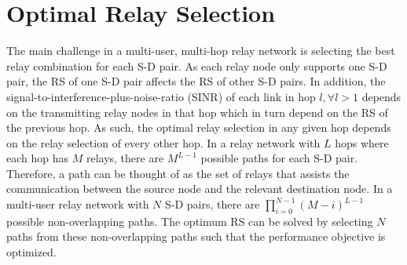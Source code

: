 \documentclass[12pt,draftclsnofoot,onecolumn]{IEEEtran}
\begin{document}
	\section{Optimal Relay Selection}\label{Sec-optimal}	
	The main challenge in a multi-user, multi-hop relay network is selecting the best relay combination for each S-D pair. As each relay node only supports one S-D pair, the RS of one S-D pair affects the RS of other S-D pairs. In addition, the signal-to-interference-plus-noise-ratio (SINR) of each link in hop $l, \forall l > 1$ depends on the transmitting relay nodes in that hop which in turn depend on the RS of the previous hop. As such, the optimal relay selection in any given hop depends on the relay selection of every other hop.
	In a relay network with $L$ hops where each hop has $M$ relays, there are $M^{L-1}$ possible paths for each S-D pair. Therefore, a path can be thought of as the set of relays that assists the communication between the source node and the relevant destination node. In a multi-user relay network with $N$ S-D pairs, there are $\prod_{i=0}^{N-1} (M-i)^{L-1}$ possible non-overlapping paths. The optimum RS can be solved by selecting $N$ paths from these non-overlapping paths such that the performance objective is optimized. 
	
\end{document}
